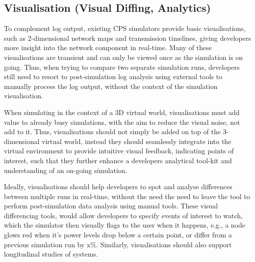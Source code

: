 \subsection{Visualisation (Visual Diffing, Analytics)}
\label{sub:requirements_Visualisation}
To complement log output, existing CPS simulators provide basic visualisations, such as 2-dimensional network maps and transmission timelines, giving developers more insight into the network component in real-time. Many of these visualisations are transient and can only be viewed once as the simulation is on going. Thus, when trying to compare two separate simulation runs, developers still need to resort to post-simulation log analysis using external tools to manually process the log output, without the context of the simulation visualisation. 

When simulating in the context of a 3D virtual world, visualisations must add value to already busy simulations, with the aim to reduce the visual noise, not add to it. Thus, visualisations should not simply be added on top of the 3-dimensional virtual world, instead they should seamlessly integrate into the virtual environment to provide intuitive visual feedback, indicating points of interest, such that they further enhance a developers analytical tool-kit and understanding of an on-going simulation. 

Ideally, visualisations should help developers to spot and analyse differences between multiple runs in real-time, without the need the need to leave the tool to perform post-simulation data analysis using manual tools. These visual differencing tools, would allow developers to specify events of interest to watch, which the simulator then visually flags to the user when it happens, e.g., a node glows red when it's power levels drop below a certain point, or differ from a previous simulation run by x\%. Similarly, visualisations should also support longitudinal studies of systems.



